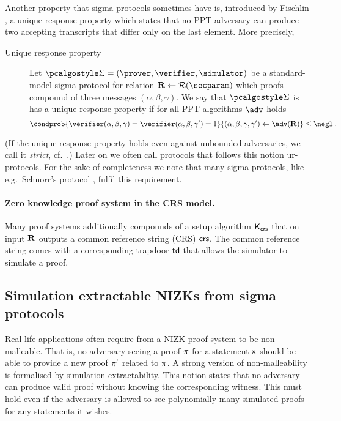\documentclass[runningheads,11pt]{llncs}
\theoremstyle{definition}
\begin{document}
Another property that sigma protocols sometimes have is, introduced by Fischlin \cite{C:Fischlin05}, a unique response property which states that no PPT adversary  can produce two accepting transcripts that differ only on the last element.
More precisely,
\begin{description}
	\item[Unique response property] Let $\sigmaprot = (\prover, \verifier, \simulator)$ be a standard-model sigma-protocol for relation $\REL \gets \RELGEN(\secparam)$ which proofs compound of three messages $(\alpha, \beta, \gamma)$. We say that $\sigmaprot$ is has a unique response property if for all PPT algorithms $\adv$ holds
	\[
	\condprob{\verifier (\alpha, \beta, \gamma) = \verifier (\alpha, \beta, \gamma')  = 1}{(\alpha, \beta, \gamma, \gamma') \gets \adv(\REL)} \leq \negl\,.
	\]
\end{description}
(If the unique response property holds even against unbounded adversaries, we call it \emph{strict}, cf.~\cite{INDOCRYPT:FKMV12}.)
Later on we often call protocols that follows this notion ur-protocols.
For the sake of completeness we note that many sigma-protocols, like e.g.~Schnorr's protocol \cite{C:Schnorr89}, fulfil this requirement.

\paragraph{Zero knowledge proof system in the CRS model.}
Many proof systems additionally compounds of a setup algorithm $\mathsf{K}_{\mathsf{crs}}$ that on input $\mathbf{R}$ outputs a common reference string (CRS) $\mathsf{crs}$. The common reference string comes with a corresponding trapdoor $\mathsf{td}$ that allows the simulator to simulate a proof.

\subsection{Simulation extractable NIZKs from sigma protocols}
Real life applications often require from a NIZK proof system to be non-malleable. That is, no adversary seeing a proof $\pi$ for a statement $\mathsf{x}$ should be able to provide a new proof $\pi'$ related to $\pi$.
A strong version of non-malleability is formalised by simulation extractability.
This notion states that no adversary can produce valid proof without knowing
the corresponding witness. This must hold even if the adversary is allowed to see polynomially many simulated proofs for any statements it wishes.
\end{document}
